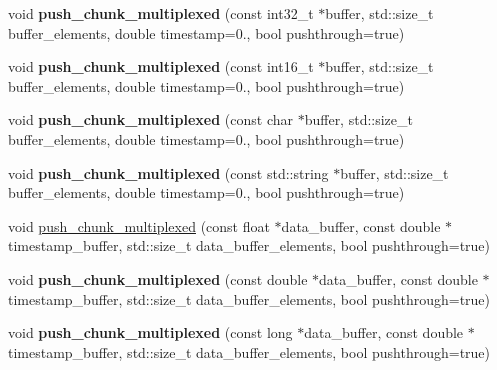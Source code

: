 \begin{DoxyCompactItemize}
\item 
\mbox{\label{classlsl_1_1stream__outlet_a161ead63f9a373d69744c3c54a650c1d}} 
void {\bfseries push\+\_\+chunk\+\_\+multiplexed} (const int32\+\_\+t $\ast$buffer, std\+::size\+\_\+t buffer\+\_\+elements, double timestamp=0., bool pushthrough=true)
\item 
\mbox{\label{classlsl_1_1stream__outlet_a78a48678f40e2bbb591aa0b9da9891d8}} 
void {\bfseries push\+\_\+chunk\+\_\+multiplexed} (const int16\+\_\+t $\ast$buffer, std\+::size\+\_\+t buffer\+\_\+elements, double timestamp=0., bool pushthrough=true)
\item 
\mbox{\label{classlsl_1_1stream__outlet_ab462e099798c3055b8f976767b239379}} 
void {\bfseries push\+\_\+chunk\+\_\+multiplexed} (const char $\ast$buffer, std\+::size\+\_\+t buffer\+\_\+elements, double timestamp=0., bool pushthrough=true)
\item 
\mbox{\label{classlsl_1_1stream__outlet_a2b4da4c1a2c3c47f39ed8a3f2cc717a5}} 
void {\bfseries push\+\_\+chunk\+\_\+multiplexed} (const std\+::string $\ast$buffer, std\+::size\+\_\+t buffer\+\_\+elements, double timestamp=0., bool pushthrough=true)
\item 
void \hyperlink{classlsl_1_1stream__outlet_a4cc12f447c2ccfe67a118a3c23215f0d}{push\+\_\+chunk\+\_\+multiplexed} (const float $\ast$data\+\_\+buffer, const double $\ast$timestamp\+\_\+buffer, std\+::size\+\_\+t data\+\_\+buffer\+\_\+elements, bool pushthrough=true)
\item 
\mbox{\label{classlsl_1_1stream__outlet_a4f476f737355d7c2b128dcc1798f46b7}} 
void {\bfseries push\+\_\+chunk\+\_\+multiplexed} (const double $\ast$data\+\_\+buffer, const double $\ast$timestamp\+\_\+buffer, std\+::size\+\_\+t data\+\_\+buffer\+\_\+elements, bool pushthrough=true)
\item 
\mbox{\label{classlsl_1_1stream__outlet_a3ec413951e8613ce5289a265aaabf6e9}} 
void {\bfseries push\+\_\+chunk\+\_\+multiplexed} (const long $\ast$data\+\_\+buffer, const double $\ast$timestamp\+\_\+buffer, std\+::size\+\_\+t data\+\_\+buffer\+\_\+elements, bool pushthrough=true)
\item 

\end{DoxyCompactItemize}
